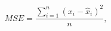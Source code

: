 \begin{equation}
MSE = \frac{\sum _{i=1}^{n} (x_{i}-\widehat{x}_{i})^{2}}{n} ,
\label{eq:meanSquareError}
\end{equation}